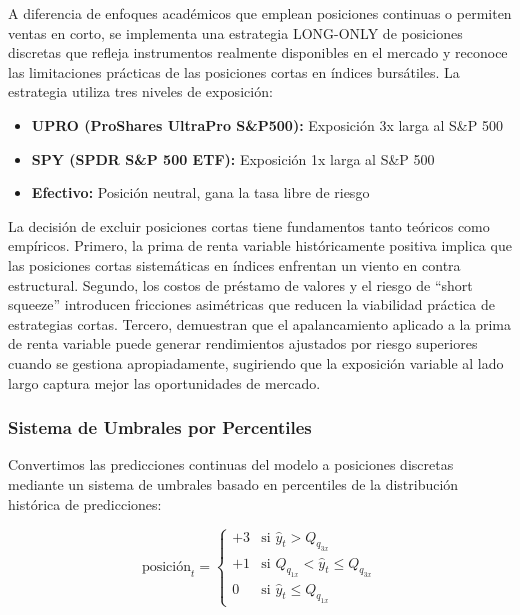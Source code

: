 \documentclass[11pt,a4paper]{article}
\begin{document}
A diferencia de enfoques académicos que emplean posiciones continuas o permiten ventas en corto, se implementa una estrategia LONG-ONLY de posiciones discretas que refleja instrumentos realmente disponibles en el mercado y reconoce las limitaciones prácticas de las posiciones cortas en índices bursátiles. La estrategia utiliza tres niveles de exposición:

\begin{itemize}[noitemsep]
    \item \textbf{UPRO (ProShares UltraPro S\&P500):} Exposición 3x larga al S\&P 500
    \item \textbf{SPY (SPDR S\&P 500 ETF):} Exposición 1x larga al S\&P 500
    \item \textbf{Efectivo:} Posición neutral, gana la tasa libre de riesgo
\end{itemize}

La decisión de excluir posiciones cortas tiene fundamentos tanto teóricos como empíricos. Primero, la prima de renta variable históricamente positiva implica que las posiciones cortas sistemáticas en índices enfrentan un viento en contra estructural. Segundo, los costos de préstamo de valores y el riesgo de ``short squeeze'' introducen fricciones asimétricas que reducen la viabilidad práctica de estrategias cortas. Tercero, \citet{frazzini2012} demuestran que el apalancamiento aplicado a la prima de renta variable puede generar rendimientos ajustados por riesgo superiores cuando se gestiona apropiadamente, sugiriendo que la exposición variable al lado largo captura mejor las oportunidades de mercado.

\subsubsection{Sistema de Umbrales por Percentiles}

Convertimos las predicciones continuas del modelo a posiciones discretas mediante un sistema de umbrales basado en percentiles de la distribución histórica de predicciones:

\begin{equation}
\text{posición}_t = \begin{cases}
+3 & \text{si } \hat{y}_t > Q_{q_{3x}} \\
+1 & \text{si } Q_{q_{1x}} < \hat{y}_t \leq Q_{q_{3x}} \\
0 & \text{si } \hat{y}_t \leq Q_{q_{1x}}
\end{cases}
\end{equation}
\end{document}
